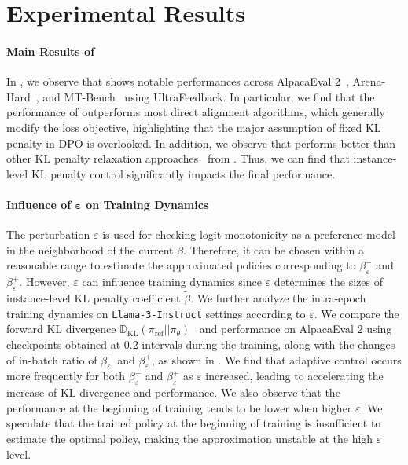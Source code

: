 \section{Experimental Results}



\paragraph{Main Results of \methodb{}}
In , we observe that \method{} shows notable performances across AlpacaEval 2~\cite{dubois2024length}, Arena-Hard~\cite{li2024crowdsourced}, and MT-Bench~\cite{jiang2023llm} using UltraFeedback. In particular, we find that the performance of \method{} outperforms most direct alignment algorithms, which generally modify the loss objective, highlighting that the major assumption of fixed KL penalty in DPO is overlooked. In addition, we observe that \method{} performs better than other KL penalty relaxation approaches~\cite{wu2024beta, gorbatovski2024learn} from . Thus, we can find that instance-level KL penalty control significantly impacts the final performance.



\paragraph{Influence of $\bm{\varepsilon}$ on Training Dynamics}
The perturbation $\varepsilon$ is used for checking logit monotonicity as a preference model in the neighborhood of the current $\beta$. Therefore, it can be chosen within a reasonable range to estimate the approximated policies corresponding to $\beta^-_\varepsilon$ and $\beta^+_\varepsilon$. However, $\varepsilon$ can influence training dynamics since $\varepsilon$ determines the sizes of instance-level KL penalty coefficient $\tilde{\beta}$. We further analyze the intra-epoch training dynamics on \texttt{Llama-3-Instruct} settings according to $\varepsilon$. We compare the forward KL divergence $\mathbb{D}_\text{KL}(\pi_\text{ref}||\pi_\theta)$~\cite{rafailov2024scaling} and performance on AlpacaEval 2 using checkpoints obtained at 0.2 intervals during the training, along with the changes of in-batch ratio of $\beta^-_\varepsilon$ and $\beta^+_\varepsilon$, as shown in . We find that adaptive control occurs more frequently for both $\beta^-_\varepsilon$ and $\beta^+_\varepsilon$ as $\varepsilon$ increased, leading to accelerating the increase of KL divergence and performance. We also observe that the performance at the beginning of training tends to be lower when higher $\varepsilon$. We speculate that the trained policy at the beginning of training is insufficient to estimate the optimal policy, making the approximation unstable at the high $\varepsilon$ level.

